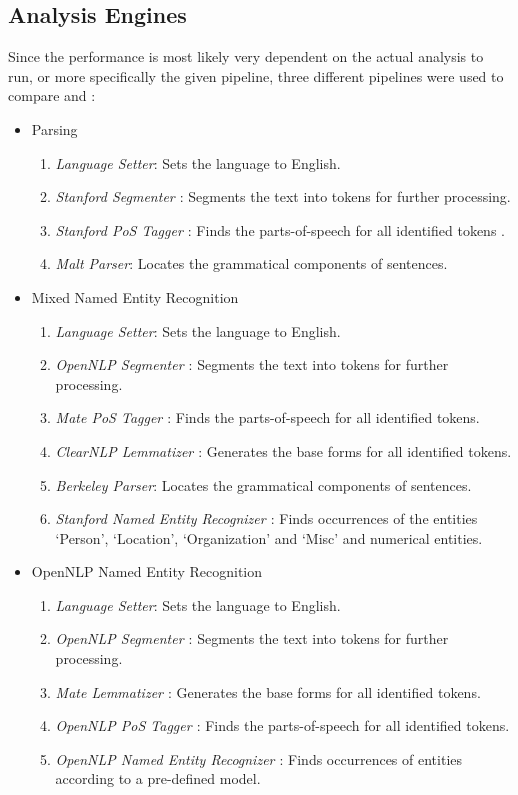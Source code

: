 \subsection{Analysis Engines}
Since the performance is most likely very dependent on the actual analysis to run, or more specifically the given pipeline, three different pipelines were used to compare \uimaas{} and \spark{}:
\begin{itemize}
	\item{}Parsing
	\begin{enumerate}
		\item{}\emph{Language Setter}: Sets the \cas{} language to English. 
		\item{}\emph{Stanford Segmenter \cite{manning-EtAl:2014:P14-5}}: Segments the text into tokens for further processing.
		\item{}\emph{Stanford PoS Tagger \cite{manning-EtAl:2014:P14-5}}: Finds the parts-of-speech for all identified tokens \cite{toutanova2003feature}.
		\item{}\emph{Malt Parser\cite{Nivre05maltparser:a}}: Locates the grammatical components of sentences.
	\end{enumerate}
	\item{}Mixed Named Entity Recognition
	\begin{enumerate}
		\item{}\emph{Language Setter}: Sets the \cas{} language to English. 
		\item{}\emph{OpenNLP Segmenter \cite{opennlp}}: Segments the text into tokens for further processing.
		\item{}\emph{Mate PoS Tagger \cite{bohnet2010very}}: Finds the parts-of-speech for all identified tokens.
		\item{}\emph{ClearNLP Lemmatizer \cite{manning-EtAl:2014:P14-5}}: Generates the base forms for all identified tokens.
		\item{}\emph{Berkeley Parser\cite{petrov2006learning,petrov2007improved}}: Locates the grammatical components of sentences.
		\item{}\emph{Stanford Named Entity Recognizer \cite{manning-EtAl:2014:P14-5}}: Finds occurrences of the entities `Person', `Location', `Organization' and `Misc' and numerical entities.
	\end{enumerate}
	\item{}OpenNLP Named Entity Recognition
	\begin{enumerate}
		\item{}\emph{Language Setter}: Sets the \cas{} language to English. 
		\item{}\emph{OpenNLP Segmenter \cite{opennlp}}: Segments the text into tokens for further processing.
		\item{}\emph{Mate Lemmatizer \cite{bohnet2010very}}: Generates the base forms for all identified tokens.
		\item{}\emph{OpenNLP PoS Tagger \cite{opennlp}}: Finds the parts-of-speech for all identified tokens.
		\item{}\emph{OpenNLP Named Entity Recognizer \cite{opennlp}}: Finds occurrences of entities according to a pre-defined model.
		

\end{enumerate}
\end{itemize}
